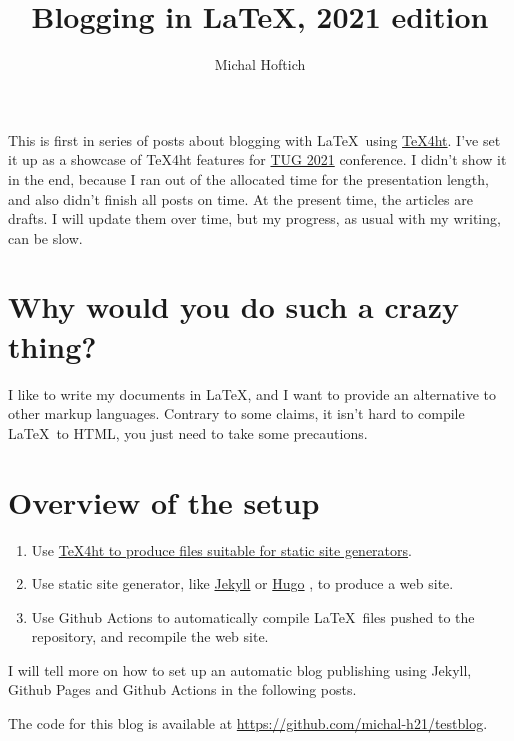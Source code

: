 \documentclass{article}
\title{Blogging in LaTeX, 2021 edition}
\author{Michal Hoftich}
\begin{document}
\maketitle



This is first in series of posts about blogging with \LaTeX\ using
\href{https://tug.org/tex4ht/}{\TeX4ht}. I've set it up as a showcase of
\TeX4ht features for \href{https://tug.org/tug2021/}{TUG 2021} conference.
I didn't show it in the end, because I ran out of the allocated time 
for the presentation length, and also didn't finish all posts on time. 
At the present time, the articles are drafts. I will update them over time,
but my progress, as usual with my writing, can be slow.

\tableofcontents

\section*{Why would you do such a crazy thing?}

I like to write my documents in \LaTeX, and I want to provide an alternative
to other markup languages. Contrary to some claims, it isn't hard to compile
\LaTeX\ to HTML, you just need to take some precautions.


\section*{Overview of the setup}

\begin{enumerate}
\item Use \href{/testblog/2021/07/30/how-to-blog-with-tex4ht.html}
{\TeX4ht to produce files suitable for static site generators}.
\item Use static site generator, like \href{https://jekyllrb.com/}{Jekyll}
or \href{https://gohugo.io/}{Hugo}
, to produce a web site.
\item Use Github Actions to automatically compile \LaTeX\ files pushed
to the repository, and recompile the web site. 
\end{enumerate}

I will tell more on how to set up an automatic
blog publishing using Jekyll, Github Pages and Github Actions in the following posts.

The code for this blog is available at
\url{https://github.com/michal-h21/testblog}.
\end{document}
